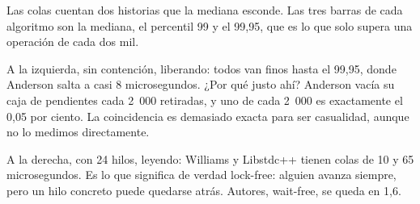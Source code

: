 Las colas cuentan dos historias que la mediana esconde. Las tres barras de cada algoritmo son la mediana, el percentil 99 y el 99,95, que es lo que solo supera una operación de cada dos mil.

A la izquierda, sin contención, liberando: todos van finos hasta el 99,95, donde Anderson salta a casi 8 microsegundos. ¿Por qué justo ahí? Anderson vacía su caja de pendientes cada 2~000 retiradas, y uno de cada 2~000 es exactamente el 0,05 por ciento. La coincidencia es demasiado exacta para ser casualidad, aunque no lo medimos directamente.

A la derecha, con 24 hilos, leyendo: Williams y Libstdc++ tienen colas de 10 y 65 microsegundos. Es lo que significa de verdad lock-free: alguien avanza siempre, pero un hilo concreto puede quedarse atrás. Autores, wait-free, se queda en 1,6.
